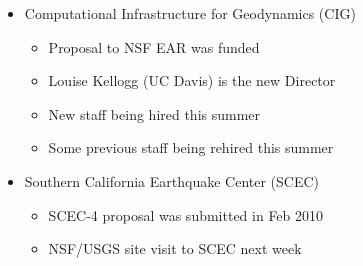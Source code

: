 \documentclass[pdftex,cig,slideColor]{pp4slides}
\begin{document}
\bgclear
\bgadd{}

  \summary{}
 
  \begin{itemize}
  \item Computational Infrastructure for Geodynamics (CIG)
    \begin{itemize}
    \item Proposal to NSF EAR was funded
    \item Louise Kellogg (UC Davis) is the new Director
    \item New staff being hired this summer
    \item Some previous staff being rehired this summer
  \end{itemize}
  \item Southern California Earthquake Center (SCEC)
    \begin{itemize}
    \item SCEC-4 proposal was submitted in Feb 2010
    \item NSF/USGS site visit to SCEC next week
   \end{itemize}
  \end{itemize}
 


  \summary{}
 
\end{document}
